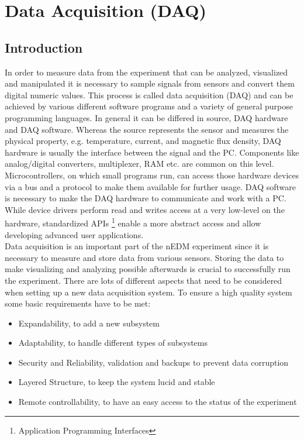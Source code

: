 \chapter{Data Acquisition (DAQ)}
 
\section{Introduction}

In order to measure data from the experiment that can be analyzed, visualized and manipulated it is necessary to sample signals from sensors and convert them digital numeric values. This process is called data acquisition (DAQ) and can be achieved by various different software programs and a variety of general purpose programming languages. In general it can be differed in source, DAQ hardware and DAQ software. Whereas the source represents the sensor and measures the physical property, e.g. temperature, current, and magnetic flux density, DAQ hardware is usually the interface between the signal and the PC. Components like analog/digital converters, multiplexer, RAM etc. are common on this level. Microcontrollers, on which small programs run, can access those hardware devices via a bus and a protocol to make them available for further usage. DAQ software is necessary to make the DAQ hardware to communicate and work with a PC. While device drivers perform read and writes access at a very low-level on the hardware, standardized APIs \footnote{Application Programming Interfaces} enable a more abstract access and allow developing advanced user applications.\\

Data acquisition is an important part of the nEDM experiment since it is necessary to measure and store data from various sensors. Storing the data to make visualizing and analyzing possible afterwards is crucial to successfully run the experiment. There are lots of different aspects that need to be considered when setting up a new data acquisition system. To ensure a high quality system some basic requirements have to be met\cite{Schneider12, Marino12}:

\begin{itemize}
\item Expandability, to add a new subsystem
\item Adaptability, to handle different types of subsystems 
\item Security and Reliability, validation and backups to prevent data corruption
\item Layered Structure, to keep the system lucid and stable
\item Remote controllability, to have an easy access to the status of the experiment
\end{itemize}

